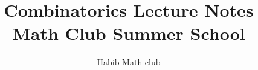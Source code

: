 \documentclass{article}
\begin{document}
\title{Combinatorics Lecture Notes\\
\vspace*{0.5cm}
\Large Math Club Summer School
}
\author{Habib Math club}
\maketitle


\renewcommand\thefootnote{}


\renewcommand\thefootnote{\fnsymbol{footnote}}
\setcounter{footnote}{1}


 


\end{document}
